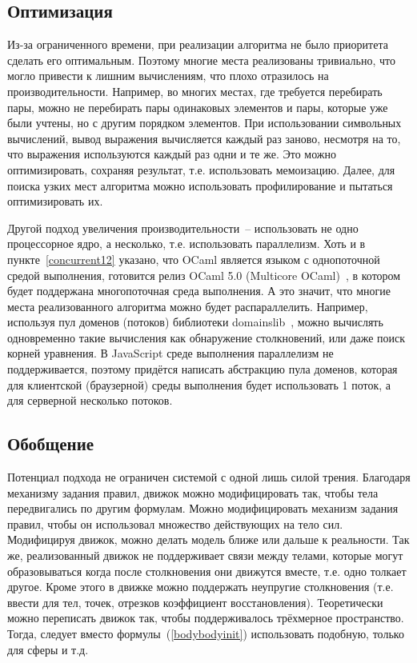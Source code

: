 \subsection{Оптимизация}\label{optimization}

Из-за ограниченного времени, при реализации алгоритма не было приоритета сделать его оптимальным.
Поэтому многие места реализованы тривиально, что могло привести к лишним вычислениям, что плохо отразилось на производительности.
Например, во многих местах, где требуется перебирать пары,
можно не перебирать пары одинаковых элементов и пары, которые уже были учтены, но с другим порядком элементов.
При использовании символьных вычислений, вывод выражения вычисляется каждый раз заново, несмотря на то, что выражения используются каждый раз одни и те же.
Это можно оптимизировать, сохраняя результат, т.е. использовать мемоизацию.
Далее, для поиска узких мест алгоритма можно использовать профилирование и пытаться оптимизировать их.

Другой подход увеличения производительности~-- использовать не одно процессорное ядро, а несколько, т.е. использовать параллелизм.
Хоть и в пункте~\ref{concurrent12} указано, что OCaml является языком с однопоточной средой выполнения,
готовится релиз OCaml 5.0 (Multicore OCaml)~\cite{infoqmulticore}, в котором будет поддержана многопоточная среда выполнения.
А это значит, что многие места реализованного алгоритма можно будет распараллелить.
Например, используя пул доменов (потоков) библиотеки domainslib~\cite{domainslibgithub},
можно вычислять одновременно такие вычисления как обнаружение столкновений, или даже поиск корней уравнения.
В JavaScript среде выполнения параллелизм не поддерживается, поэтому придётся написать абстракцию пула доменов,
которая для клиентской (браузерной) среды выполнения будет использовать 1 поток, а для серверной несколько потоков.

\subsection{Обобщение}

Потенциал подхода не ограничен системой с одной лишь силой трения.
Благодаря механизму задания правил, движок можно модифицировать так, чтобы тела передвигались по другим формулам.
Можно модифицировать механизм задания правил, чтобы он использовал множество действующих на тело сил.
Модифицируя движок, можно делать модель ближе или дальше к реальности.
Так же, реализованный движок не поддерживает связи между телами, которые
могут образовываться когда после столкновения они движутся вместе, т.е. одно толкает другое.
Кроме этого в движке можно поддержать неупругие столкновения (т.е. ввести для тел, точек, отрезков коэффициент восстановления).
Теоретически можно переписать движок так, чтобы поддерживалось трёхмерное пространство.
Тогда, следует вместо формулы~(\ref{bodybodyinit}) использовать подобную, только для сферы и т.д.


